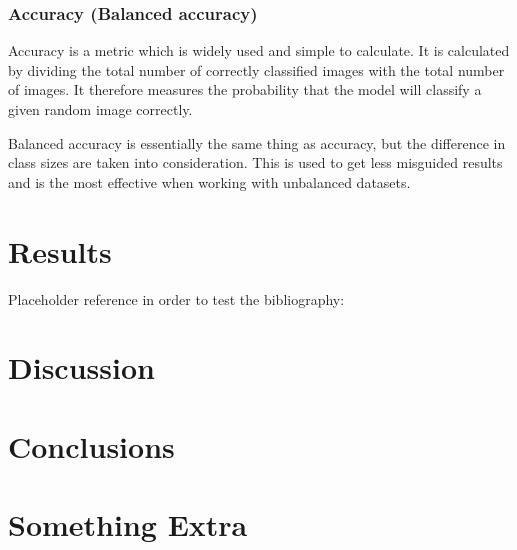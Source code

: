 \documentclass{kththesis}
\begin{document}
\subsection{Accuracy (Balanced accuracy)}

Accuracy is a metric which is widely used and simple to calculate.  It is calculated by dividing the total number of correctly classified images with the total number of images. It therefore measures the probability that the model will classify a given random image correctly. %

Balanced accuracy is essentially the same thing as accuracy, but the difference in class sizes are taken into consideration. This is used to get less misguided results and is the most effective when working with unbalanced datasets.



\chapter{Results}
Placeholder reference in order to test the bibliography: \parencite{einstein2016}
\blindtext

\chapter{Discussion}
\blindtext

\chapter{Conclusions}
\blindtext

\printbibliography[heading=bibintoc]

\appendix

\chapter{Something Extra}

\tailmatter
\end{document}

